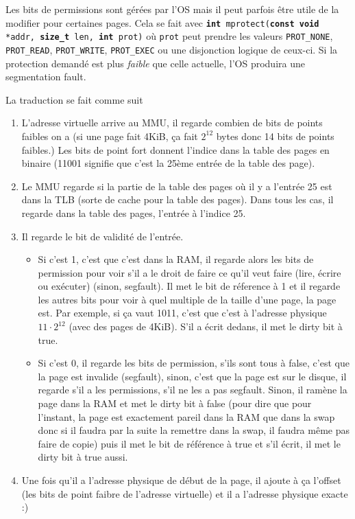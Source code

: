 Les bits de permissions sont gérées par l'OS mais il peut parfois être utile de la modifier pour certaines pages. Cela se fait avec \texttt{\textbf{int} mprotect(\textbf{const void} *addr, \textbf{size\_t} len, \textbf{int} prot)} où \texttt{prot} peut prendre les valeurs \texttt{PROT\_NONE}, \texttt{PROT\_READ}, \texttt{PROT\_WRITE}, \texttt{PROT\_EXEC} ou une disjonction logique de ceux-ci. Si la protection demandé est plus \textit{faible} que celle actuelle, l'OS produira une segmentation fault.

La traduction se fait comme suit

\begin{enumerate}
  \item L'adresse virtuelle arrive au MMU, il regarde combien de bits de
    points faibles on a
    (si une page fait \si{4}{KiB}, ça fait $2^{12}$ bytes
    donc 14 bits de points faibles.)
    Les bits de point fort donnent l'indice dans la table des pages en binaire
    (11001 signifie que c'est la 25ème entrée de la table des page).
  \item Le MMU regarde si la partie de la table des pages où il y a l'entrée
    25 est dans la TLB (sorte de cache pour la table des pages).
    Dans tous les cas, il regarde dans la table des pages,
    l'entrée à l'indice 25.
  \item Il regarde le bit de validité de l'entrée.
    \begin{itemize}
      \item Si c'est 1, c'est que c'est dans la RAM,
        il regarde alors les bits de permission pour voir s'il a le droit
        de faire ce qu'il veut faire (lire, écrire ou exécuter)
        (sinon, segfault).
        Il met le bit de réference à 1 et il regarde les autres bits pour voir
        à quel multiple de la taille d'une page, la page est.
        Par exemple, si ça vaut 1011, c'est que c'est à l'adresse physique
        $11\cdot 2^{12}$ (avec des pages de \si{4}{KiB}).
        S'il a écrit dedans, il met le dirty bit à true.
      \item Si c'est 0,
        il regarde les bits de permission, s'ils sont tous à false,
        c'est que la page est invalide (segfault),
        sinon, c'est que la page est sur le disque,
        il regarde s'il a les permissions, s'il ne les a pas segfault.
        Sinon, il ramène la page dans la RAM et met le dirty bit à false
        (pour dire que pour l'instant, la page est exactement pareil dans
        la RAM que dans la swap donc si il faudra par la suite la remettre
        dans la swap, il faudra même pas faire de copie)
        puis il met le bit de référence à true et s'il écrit,
        il met le dirty bit à true aussi.
    \end{itemize}
  \item Une fois qu'il a l'adresse physique de début de la page,
    il ajoute à ça l'offset (les bits de point faibre de l'adresse virtuelle)
    et il a l'adresse physique exacte :)
\end{enumerate}

